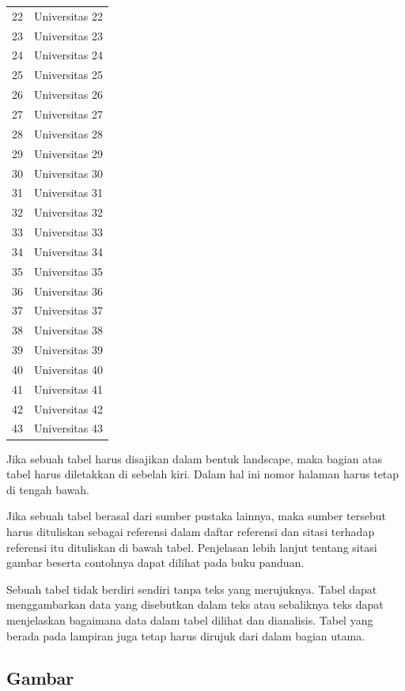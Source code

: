 \begin{longtable}{cl}
      22 & Universitas 22 \\
      23 & Universitas 23 \\
      24 & Universitas 24 \\
      25 & Universitas 25 \\
      26 & Universitas 26 \\
      27 & Universitas 27 \\
      28 & Universitas 28 \\
      29 & Universitas 29 \\
      30 & Universitas 30 \\
      31 & Universitas 31 \\
      32 & Universitas 32 \\
      33 & Universitas 33 \\
      34 & Universitas 34 \\
      35 & Universitas 35 \\
      36 & Universitas 36 \\
      37 & Universitas 37 \\
      38 & Universitas 38 \\
      39 & Universitas 39 \\
      40 & Universitas 40 \\
      41 & Universitas 41 \\
      42 & Universitas 42 \\
      43 & Universitas 43 \\
      \hline
  \end{longtable}

Jika sebuah tabel harus disajikan dalam bentuk landscape, maka bagian atas tabel harus diletakkan di sebelah kiri. Dalam hal ini nomor halaman harus tetap di tengah bawah.   

Jika sebuah tabel berasal dari sumber pustaka lainnya, maka sumber tersebut harus dituliskan sebagai referensi dalam daftar referensi dan sitasi terhadap referensi itu dituliskan di bawah tabel. Penjelasan lebih lanjut tentang sitasi gambar beserta contohnya dapat dilihat pada buku panduan. 

Sebuah tabel tidak berdiri sendiri tanpa teks yang merujuknya. Tabel dapat menggambarkan data yang disebutkan dalam teks atau sebaliknya teks dapat menjelaskan bagaimana data dalam tabel dilihat dan dianalisis. Tabel yang berada pada lampiran juga tetap harus dirujuk dari dalam bagian utama.

\subsection{Gambar}

